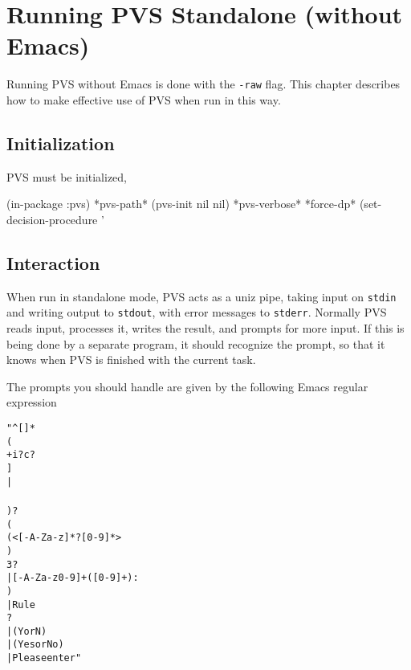 \chapter{Running PVS Standalone (without Emacs)}

Running PVS without Emacs is done with the \texttt{-raw} flag.  This
chapter describes how to make effective use of PVS when run in this way.

\section{Initialization}

PVS must be initialized,

(in-package :pvs)
*pvs-path*
(pvs-init nil nil)
*pvs-verbose*
*force-dp*
(set-decision-procedure '%

\section{Interaction}

When run in standalone mode, PVS acts as a uniz pipe, taking input on
\texttt{stdin} and writing output to \texttt{stdout}, with error messages
to \texttt{stderr}.  Normally PVS reads input, processes it, writes the
result, and prompts for more input.  If this is being done by a separate
program, it should recognize the prompt, so that it knows when PVS is
finished with the current task.

The prompts you should handle are given by the following Emacs regular
expression
\begin{alltt}
"^[ ]*\\(\\[[0-9]+i?c?\\] \\|\\[step\\] \\)?\\(\\(<[-A-Za-z]* ?[0-9]*> \\)\\3?\\|[-A-Za-z0-9]+([0-9]+): \\)\\|Rule\\? \\|(Y or N)\\|(Yes or No)\\|Please enter"
\end{alltt}

